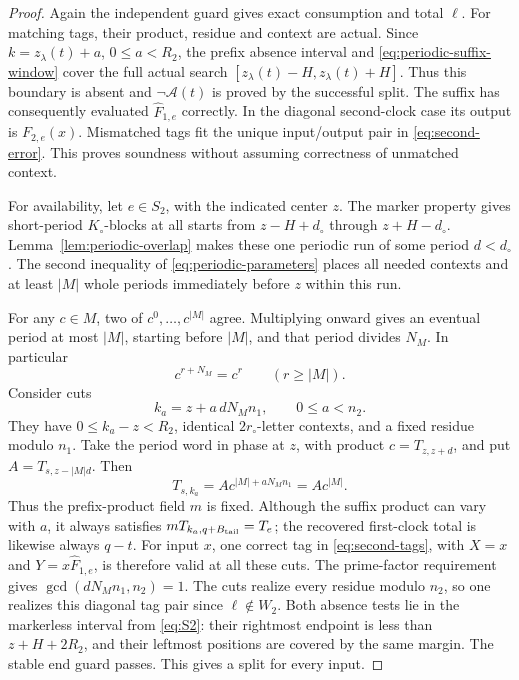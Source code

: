 \begin{proof}
Again the independent guard gives exact consumption and total \(\ell\).
For matching tags, their product, residue and context are actual.
Since \(k=z_\lambda(t)+a\), \(0\le a<R_2\), the prefix absence interval and
\eqref{eq:periodic-suffix-window} cover the full actual search
\([z_\lambda(t)-H,z_\lambda(t)+H]\). Thus this boundary is absent and
\(\neg\mathcal A(t)\) is proved by the successful split.
The suffix has consequently evaluated \(\widehat F_{1,e}\) correctly.
In the diagonal second-clock case its output is \(F_{2,e}(x)\).
Mismatched tags fit the unique input/output pair in \eqref{eq:second-error}.
This proves soundness without assuming correctness of unmatched context.

For availability, let \(e\in S_2\), with the indicated center \(z\).
The marker property gives short-period \(K_\circ\)-blocks at all starts
from \(z-H+d_\circ\) through \(z+H-d_\circ\).
Lemma~\ref{lem:periodic-overlap} makes these one periodic run of some
period \(d<d_\circ\). The second inequality of
\eqref{eq:periodic-parameters} places all needed contexts and at least
\(|M|\) whole periods immediately before \(z\) within this run.

For any \(c\in M\), two of \(c^0,\ldots,c^{|M|}\) agree. Multiplying onward
gives an eventual period at most \(|M|\), starting before \(|M|\), and that
period divides \(N_M\). In particular
\[
                    c^{r+N_M}=c^r\qquad(r\ge|M|).
\]
Consider cuts
\begin{equation}\label{eq:special-cuts}
                k_a=z+a\,dN_Mn_1,\qquad 0\le a<n_2.
\end{equation}
They have \(0\le k_a-z<R_2\), identical \(2r_\circ\)-letter contexts,
and a fixed residue modulo \(n_1\). Take the period word in phase at \(z\),
with product \(c=T_{z,z+d}\), and put \(A=T_{s,z-|M|d}\). Then
\[
 T_{s,k_a}=Ac^{|M|+aN_Mn_1}=Ac^{|M|}.
\]
Thus the prefix-product field \(m\) is fixed. Although the suffix product
can vary with \(a\), it always satisfies \(mT_{k_a,q+B_{\rm tail}}=T_e\);
the recovered first-clock total is likewise always \(q-t\).
For input \(x\), one correct tag in \eqref{eq:second-tags}, with
\(X=x\) and \(Y=x\widehat F_{1,e}\), is therefore valid at all these cuts.
The prime-factor requirement gives
\(\gcd(dN_Mn_1,n_2)=1\). The cuts realize every residue modulo \(n_2\),
so one realizes this diagonal tag pair since \(\ell\notin W_2\).
Both absence tests lie in the markerless interval from \eqref{eq:S2}:
their rightmost endpoint is less than \(z+H+2R_2\), and their leftmost
positions are covered by the same margin. The stable end guard passes.
This gives a split for every input.
\end{proof}

